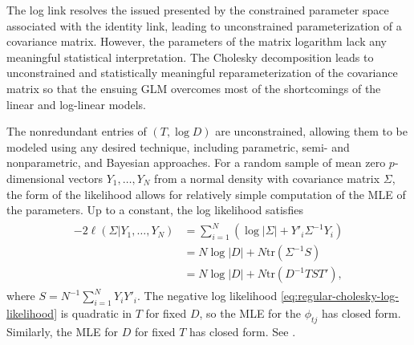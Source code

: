 The log link resolves the issued presented by the constrained parameter space associated with the identity link, leading to unconstrained parameterization of a covariance matrix. However, the parameters of the matrix logarithm lack any meaningful statistical interpretation. %
The Cholesky decomposition leads to unconstrained and statistically meaningful reparameterization of the covariance matrix so that the ensuing GLM overcomes most of the shortcomings of the linear and log-linear models.  %

%
The nonredundant entries of $\left(T, \log D\right)$ are unconstrained, allowing them to be modeled using any desired technique, including parametric, semi- and nonparametric, and Bayesian approaches. For a random sample of mean zero $p$-dimensional vectors $Y_1,\dots , Y_N$  from a normal density with covariance matrix $\Sigma$, the form of the likelihood allows for relatively simple computation of the MLE of the parameters. Up to a constant, the log likelihood satisfies
\begin{align}
\begin{split} \label{eq:regular-cholesky-log-likelihood}
-2\ell\left(\Sigma \vert Y_1,\dots, Y_N\right) &= \sum_{i = 1}^N \left( \log \vert \Sigma \vert  + Y'_i \Sigma^{-1}Y_i\right) \\
&= N \log \vert D \vert + N \mbox{tr}\left(\Sigma^{-1}S\right) \\
& = N \log \vert D \vert + N \mbox{tr}\left(D^{-1}TST'\right), 
\end{split}
\end{align}
\noindent
where $S = N^{-1}\sum_{i=1}^N Y_iY'_i$. The negative log likelihood \eqref{eq:regular-cholesky-log-likelihood} is quadratic in $T$ for fixed $D$, so the MLE for the $\phi_{tj}$ has closed form. Similarly, the MLE for $D$ for fixed $T$ has closed form. See \cite{pourahmadi2000maximum}. 

